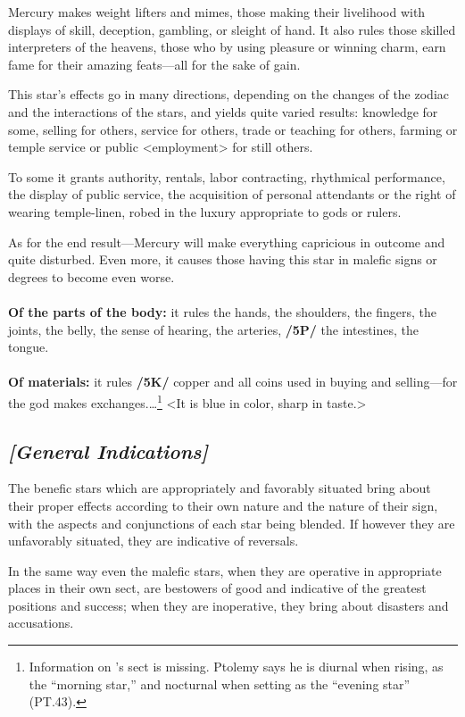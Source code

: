 Mercury makes weight lifters and mimes, those making their livelihood with displays of skill, deception, gambling, or sleight of hand. It also rules those skilled interpreters of the heavens, those who by using pleasure or winning charm, earn fame for their amazing feats—all for the sake of gain. 

\mndl[0.2cm]
This star’s effects go in many directions, depending on the changes of the zodiac and the interactions of the stars, and yields quite varied results: knowledge for some, selling for others, service for others, trade or teaching for others, farming or temple service or public <employment> for still others. 

To some it grants authority, rentals, labor contracting, rhythmical performance, the display of public service,
the acquisition of personal attendants or the right of wearing temple-linen, robed in the luxury appropriate
to gods or rulers. 

\mndl[0.2cm]
As for the end result—Mercury will make everything capricious in outcome and quite disturbed. Even more, it causes those having this star in malefic signs or degrees to become even worse. \\
\\
\textbf{Of the parts of the body:} it rules the hands, the shoulders, the fingers, the joints, the belly, the sense of hearing, the arteries, \textbf{/5P/} the intestines, the tongue. \\
\\
\textbf{Of materials:} it rules \textbf{/5K/} copper and all coins used in buying and selling—for the god makes exchanges.\ldots\footnote{Information on \Mercury's sect is missing. Ptolemy says he is diurnal when rising, as the ``morning star,'' and nocturnal when setting as the ``evening star'' (PT.43).} <It is blue in color, sharp in taste.>

\secbr
\subsection{\textit{[General Indications]}}
\mndl[0.2cm]
The benefic stars which are appropriately and favorably situated bring about their proper effects according to their own nature and the nature of their sign, with the aspects and conjunctions of each star being blended. If however they are unfavorably situated, they are indicative of reversals. 

\mnmb[0.2cm] 
In the same way even the malefic stars, when they are operative in appropriate places in their own sect, are bestowers of good and indicative of the greatest positions and success; when they are inoperative, they bring about disasters and accusations.

